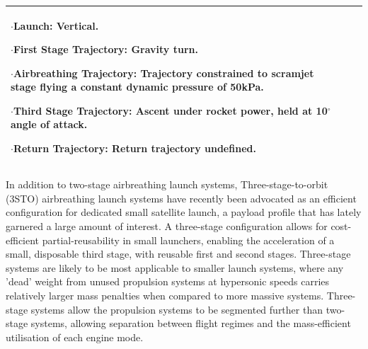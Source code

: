 {\begin{landscape}
\begin{xltabular}{\linewidth}{|X|X|X|}
	
	$\cdot$\textbf{Launch:} Vertical.
	
	$\cdot$\textbf{First Stage Trajectory:} Gravity turn. 
	
	$\cdot$\textbf{Airbreathing Trajectory:} Trajectory constrained to scramjet stage flying a constant dynamic pressure of 50kPa. 
	
	$\cdot$\textbf{Third Stage Trajectory:} Ascent under rocket power, held at 10$^\circ$ angle of attack. 
	
	$\cdot$\textbf{Return Trajectory:} Return trajectory undefined. 
	
	\\
	\hline
\end{xltabular}

\end{landscape}
}

In addition to two-stage airbreathing launch systems, Three-stage-to-orbit (3STO) airbreathing launch systems have recently been advocated as an efficient configuration for dedicated small satellite launch, a payload profile that has lately garnered a large amount of interest. A three-stage configuration allows for cost-efficient partial-reusability in small launchers, enabling the acceleration of a small, disposable third stage, with reusable first and second stages. 
Three-stage systems are likely to be most applicable to smaller launch systems, where any 'dead' weight from unused propulsion systems at hypersonic speeds carries relatively larger mass penalties when compared to more massive systems. Three-stage systems allow the propulsion systems to be segmented further than two-stage systems, allowing separation between flight regimes and the mass-efficient utilisation of each engine mode\cite{XXX}.

